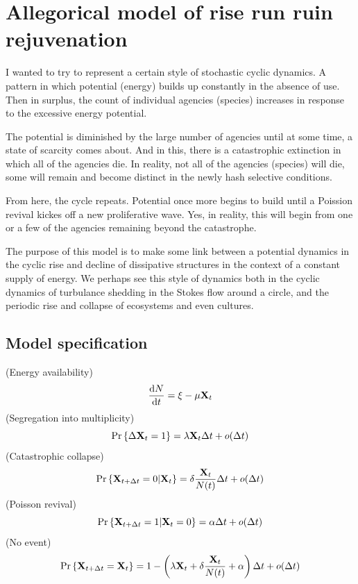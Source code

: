 \section{Allegorical model of rise run ruin rejuvenation}


I wanted to try to represent a certain style of stochastic cyclic dynamics. A pattern in which potential (energy) builds up constantly in the absence of use.  Then in surplus, the count of individual agencies (species) increases in response to the excessive energy potential. \par 
The potential is diminished by the large number of agencies until at some time,  a state of scarcity comes about. And in this, there is a catastrophic extinction in which all of the agencies die. In reality, not all of the agencies (species) will die, some will remain and become distinct in the newly hash selective conditions. \par 
From here, the cycle repeats. Potential once more begins to build until a Poission revival kickes off a new proliferative wave.  Yes, in reality, this will begin from one or a few of the agencies  remaining beyond the catastrophe. \par




\noindent
The purpose of this model is to make some link between a potential dynamics in the cyclic rise and decline of dissipative structures in the context of a constant supply of energy.  We perhaps see this style of dynamics both in the cyclic dynamics of turbulance shedding in the Stokes flow around a circle, and the periodic rise and collapse of ecosystems and even cultures. 

\subsection*{Model specification}


(Energy availability)
 $$\displaystyle\frac{{\rm d} N}{{\rm d} t} = \xi - \mu {{\bf X}_t}$$
(Segregation into multiplicity)
$${\text{Pr}\left\{\Delta {{\bf X}_t} = 1\right\}} = \lambda {{\bf X}_t} \Delta t + o(\Delta t)$$
(Catastrophic collapse)
$${\text{Pr}\left\{{{\bf X}_{t+\Delta t}} = 0 | {{\bf X}_t}\right\}} =  \delta \frac{{{\bf X}_t}}{N(t)} \Delta t +o(\Delta t)$$
(Poisson revival)
$${\text{Pr}\left\{{{\bf X}_{t+\Delta t}} = 1 | {{\bf X}_t} = 0\right\}} = \alpha \Delta t + o(\Delta t)$$
(No event)
$${\text{Pr}\left\{{{\bf X}_{t+\Delta t}} = {{\bf X}_t}\right\}} = 1 - \left(\lambda {{\bf X}_t}  + \delta \frac{{{\bf X}_t}}{N(t)} + \alpha   \right)\Delta t + o(\Delta t)$$



